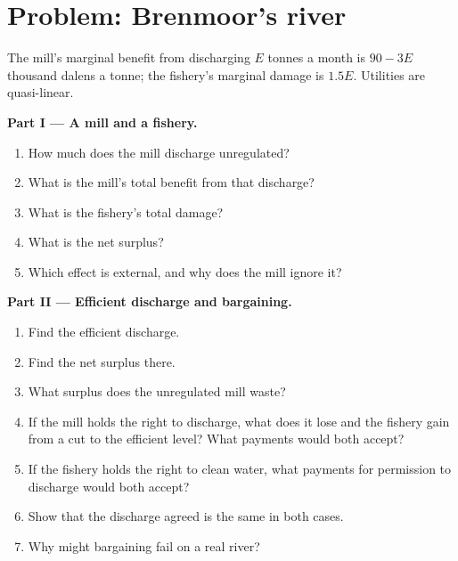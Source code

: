 \section{Problem: Brenmoor's river}\label{sec:b2:externalities-and-public-goods-theory:problem}

\begin{problem}
\label{pb:b2:externalities-and-public-goods-theory:1}
The mill's marginal benefit from discharging $E$ tonnes a month is $90 - 3E$ thousand dalens a tonne; the fishery's marginal
damage is $1.5E$. Utilities are quasi-linear.

\medskip
\noindent\textbf{Part I --- A mill and a fishery.}
\begin{enumerate}
  \item How much does the mill discharge unregulated?
  \item What is the mill's total benefit from that discharge?
  \item What is the fishery's total damage?
  \item What is the net surplus?
  \item Which effect is external, and why does the mill ignore it?
\end{enumerate}

\medskip
\noindent\textbf{Part II --- Efficient discharge and bargaining.}
\begin{enumerate}[resume]
  \item Find the efficient discharge.
  \item Find the net surplus there.
  \item What surplus does the unregulated mill waste?
  \item If the mill holds the right to discharge, what does it lose and the fishery gain from a cut to the efficient level?
    What payments would both accept?
  \item If the fishery holds the right to clean water, what payments for permission to discharge would both accept?
  \item Show that the discharge agreed is the same in both cases.
  \item Why might bargaining fail on a real river?
\end{enumerate}


\end{problem}
